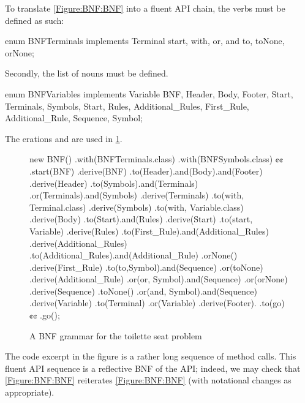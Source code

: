 To translate \cref{Figure:BNF:BNF} into a fluent
  API chain, the verbs must be defined as such:
  \begin{JAVA}
enum BNFTerminals implements Terminal {
  start, with, or, and
  to, toNone, orNone;
}
\end{JAVA}

Secondly, the list of nouns must be defined.
\begin{JAVA}
enum BNFVariables implements Variable {
  BNF, Header, Body, Footer,
  Start, Terminals, Symbols,
  Start, Rules, Additional_Rules,
  First_Rule, Additional_Rule,
  Sequence, Symbol;
}
\end{JAVA}

The
erations  and
   
  are used in \cref{Figure:BNF:fluent}.


\begin{figure}[htbp]
  \begin{JAVA}[style=numbered]
new BNF()
  .with(BNFTerminals.class)
  .with(BNFSymbols.class)
¢¢
  .start(BNF)
  .derive(BNF)
    .to(Header).and(Body).and(Footer)
  .derive(Header)
    .to(Symbols).and(Terminals)
    .or(Terminals).and(Symbols)
  .derive(Terminals)
    .to(with, Terminal.class)
  .derive(Symbols)
    .to(with, Variable.class)
  .derive(Body)
    .to(Start).and(Rules)
  .derive(Start)
    .to(start, Variable)
  .derive(Rules)
    .to(First_Rule).and(Additional_Rules)
  .derive(Additional_Rules)
    .to(Additional_Rules).and(Additional_Rule)
    .orNone()
  .derive(First_Rule)
    .to(to,Symbol).and(Sequence)
    .or(toNone)
  .derive(Additional_Rule)
    .or(or, Symbol).and(Sequence)
    .or(orNone)
  .derive(Sequence)
    .toNone()
    .or(and, Symbol).and(Sequence)
  .derive(Variable)
    .to(Terminal)
    .or(Variable)
  .derive(Footer).
     .to(go)
¢¢
.go();
  \end{JAVA}
  \caption{A BNF grammar for the toilette seat problem}
  \label{Figure:BNF:fluent}
\end{figure}

The code excerpt in the figure is a rather long
  sequence of method calls.
This fluent API sequence is a reflective BNF 
  of the \SELF API;
  indeed, we may check that \cref{Figure:BNF:BNF} reiterates \cref{Figure:BNF:BNF}
  (with notational changes as appropriate). 
